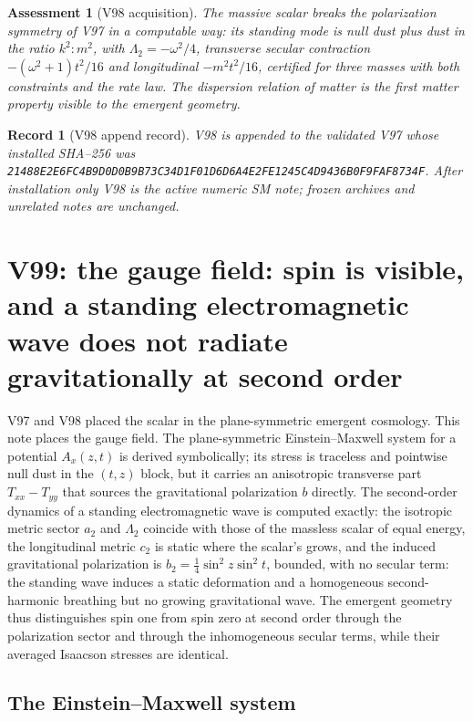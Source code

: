 \documentclass[11pt]{article}
\newtheorem{assessment}[theorem]{Assessment}
\newtheorem{record}[theorem]{Record}
\theoremstyle{remark}
\begin{document}
\begin{assessment}[V98 acquisition]
\label{ass:v19v98}
The massive scalar breaks the polarization symmetry of V97 in a
computable way: its standing mode is null dust plus dust in the
ratio \(k^2:m^2\), with \(\Lambda_2=-\omega^2/4\), transverse secular
contraction \(-(\omega^2+1)t^2/16\) and longitudinal
\(-m^2t^2/16\), certified for three masses with both constraints and
the rate law.  The dispersion relation of matter is the first
matter property visible to the emergent geometry.
\end{assessment}

\begin{record}[V98 append record]
\label{rec:v19v98}
V98 is appended to the validated V97 whose installed SHA--256 was
\texttt{21488E2E6FC4B9D0D0B9B73C34D1F01D6D6A4E2FE1245C4D9436B0F9FAF8734F}.
After installation only V98 is the active numeric SM note; frozen
archives and unrelated notes are unchanged.
\end{record}


\section{V99: the gauge field: spin is visible, and a standing electromagnetic wave does not radiate gravitationally at second order}
\label{sec:v19v99}

V97 and V98 placed the scalar in the plane-symmetric emergent
cosmology.  This note places the gauge field.  The plane-symmetric
Einstein--Maxwell system for a potential \(A_x(z,t)\) is derived
symbolically; its stress is traceless and pointwise null dust in the
\((t,z)\) block, but it carries an anisotropic transverse part
\(T_{xx}-T_{yy}\) that sources the gravitational polarization \(b\)
directly.  The second-order dynamics of a standing electromagnetic
wave is computed exactly: the isotropic metric sector \(a_2\) and
\(\Lambda_2\) coincide with those of the massless scalar of equal
energy, the longitudinal metric \(c_2\) is static where the scalar's
grows, and the induced gravitational polarization is
\(b_2=\tfrac14\sin^2z\sin^2t\), bounded, with no secular term: the
standing wave induces a static deformation and a homogeneous
second-harmonic breathing but no growing gravitational wave.  The
emergent geometry thus distinguishes spin one from spin zero at
second order through the polarization sector and through the
inhomogeneous secular terms, while their averaged Isaacson stresses
are identical.

\subsection{The Einstein--Maxwell system}
\end{document}

